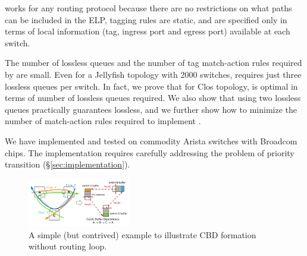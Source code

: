 
\sysname{} works for any routing protocol because there are no restrictions on
what paths can be included in the ELP, tagging rules are static, and are
specified only in terms of local information (tag, ingress port and egress port)
available at each switch.

The number of lossless queues and the number of tag match-action rules required
by \sysname{} are small.  Even for a Jellyfish topology with 2000 switches,
\sysname{} requires just three lossless queues per switch.  In fact, we prove
that for Clos topology,  \sysname{} is optimal in terms of number of lossless
queues required. We also show that using two lossless queues practically guarantees lossless, 
and we further show how to minimize the number of match-action rules
required to implement \sysname{}.

We have implemented and tested \sysname{} on commodity Arista switches with Broadcom chips. 
The implementation requires carefully addressing the problem
of priority transition (\S\ref{sec:implementation}). 


\begin{figure}[t]
		\centering
		\includegraphics[width=0.4\textwidth] {figs/deadlock}
		\caption{A simple (but contrived) example to illustrate CBD formation
		without routing loop.}
		\label{fig:basic_deadlock}
\end{figure}
